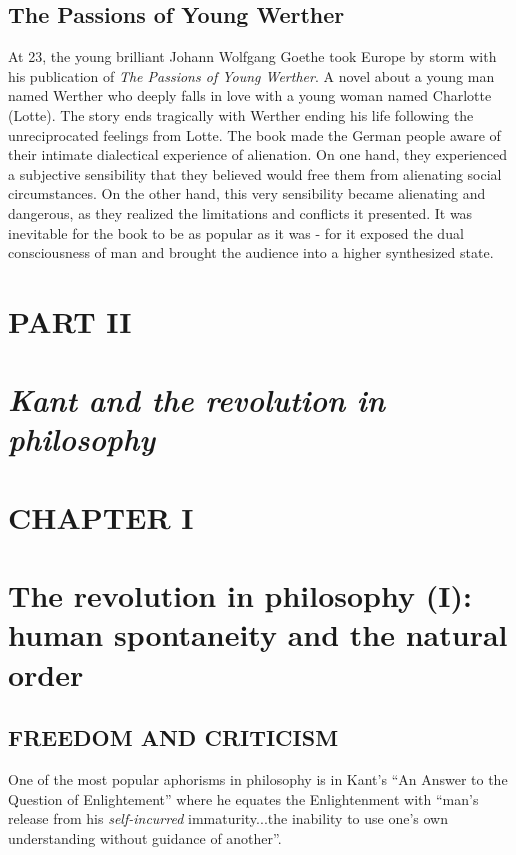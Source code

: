 \documentclass{article}
\begin{document}
\subsection{The Passions of Young Werther}
At 23, the young brilliant Johann Wolfgang Goethe took Europe by storm with his publication of \textit{The Passions of Young Werther}. A novel about a young man named Werther who deeply falls in love with a young woman named Charlotte (Lotte). 
The story ends tragically with Werther ending his life following the unreciprocated feelings from Lotte. 
The book made the German people aware of their intimate dialectical experience of alienation. On one hand, they experienced a subjective sensibility that they believed would free them from alienating social circumstances. On the other hand, this very sensibility became alienating and dangerous, as they realized the limitations and conflicts it presented.
It was inevitable for the book to be as popular as it was - for it exposed the dual consciousness of man and brought the audience into a higher synthesized state.
\newpage
\begin{center}
\section*{\small PART II}
\section*{\textit {Kant and the revolution in philosophy}}

\end{center}
\newpage

\begin{center}
\section*{\small CHAPTER I}
\section*{The revolution in philosophy (I):\\human spontaneity and the natural order}
\vspace{30mm}
\subsection*{\small FREEDOM AND CRITICISM}
\end{center}
One of the most popular aphorisms in philosophy is in Kant's ``An Answer to the Question of Enlightement'' where he equates the Enlightenment with ``man's release from his \textit{self-incurred} immaturity...the inability to use one's own understanding without guidance of another''.\\
\end{document}
